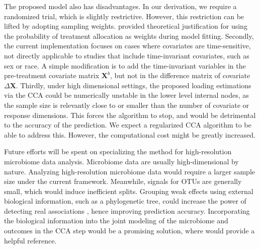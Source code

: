 \documentclass[smallextended]{svjour3}
\begin{document}
The proposed model also has disadvantages. In our derivation, we require a randomized trial, which is slightly restrictive. However, this restriction can be lifted by adopting sampling weights. \cite{tian2014simple} provided theoretical justification for using the probability of treatment allocation as weights during model fitting. Secondly, the current implementation focuses on cases where covariates are time-sensitive, not directly applicable to studies that include time-invariant covariates, such as sex or race. A simple modification is to add the time-invariant variables in the pre-treatment covariate matrix $\textbf{X}^b$, but not in the difference matrix of covariate $\Delta \textbf{X}$. Thirdly, under high dimensional settings, the proposed loading estimations via the CCA could be numerically unstable in the lower level internal nodes, as the sample size is relevantly close to or smaller than the number of covariate or response dimensions. This forces the algorithm to stop, and would be detrimental to the accuracy of the prediction. We expect a regularized CCA algorithm to be able to address this. However, the computational cost might be greatly increased.

Future efforts will be spent on specializing the method for high-resolution microbiome data analysis. Microbiome data are usually high-dimensional by nature. Analyzing high-resolution microbiome data would require a larger sample size under the current framework. Meanwhile, signals for OTUs are generally small, which would induce inefficient splits. Grouping weak effects using external biological information, such as a phylogenetic tree, could increase the power of detecting real associations \citep{peterson2016joint}, hence improving prediction accuracy. Incorporating the biological information into the joint modeling of the microbiome and outcomes in the CCA step would be a promising solution, where \citet{chen2013structure} would provide a helpful reference. 

\end{document}
